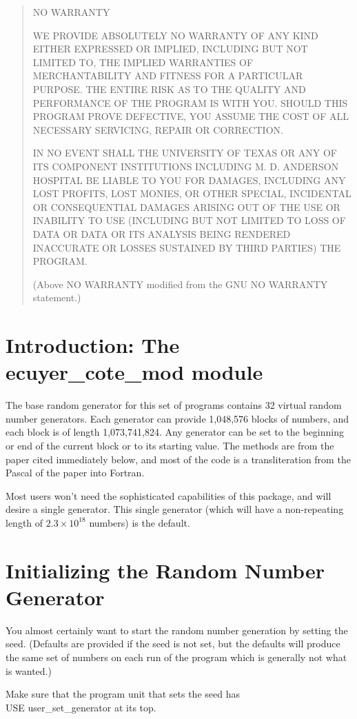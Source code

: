 \documentclass[12pt,dvips]{article}
\newcommand{\mysection}[1]{\color{blue}
            \section{#1} \normalcolor}
\begin{document}
\begin{quote}

{\centering NO WARRANTY\\}

WE PROVIDE ABSOLUTELY  NO WARRANTY  OF ANY  KIND  EITHER  EXPRESSED OR
IMPLIED,  INCLUDING BUT   NOT LIMITED TO,  THE  IMPLIED  WARRANTIES OF
MERCHANTABILITY AND FITNESS FOR A PARTICULAR PURPOSE.  THE ENTIRE RISK
AS TO THE QUALITY AND PERFORMANCE OF THE PROGRAM IS  WITH YOU.  SHOULD
THIS PROGRAM PROVE  DEFECTIVE, YOU ASSUME  THE COST  OF  ALL NECESSARY
SERVICING, REPAIR OR CORRECTION.

IN NO  EVENT  SHALL THE UNIVERSITY  OF TEXAS OR  ANY  OF ITS COMPONENT
INSTITUTIONS INCLUDING M. D.   ANDERSON HOSPITAL BE LIABLE  TO YOU FOR
DAMAGES, INCLUDING ANY  LOST PROFITS, LOST MONIES,   OR OTHER SPECIAL,
INCIDENTAL   OR  CONSEQUENTIAL DAMAGES   ARISING   OUT  OF  THE USE OR
INABILITY TO USE (INCLUDING BUT NOT LIMITED TO LOSS OF DATA OR DATA OR
ITS ANALYSIS BEING  RENDERED INACCURATE OR  LOSSES SUSTAINED  BY THIRD
PARTIES) THE PROGRAM.

(Above NO WARRANTY modified from the GNU NO WARRANTY statement.)
\end{quote}


\pagebreak

\mysection{Introduction: The ecuyer\_cote\_mod module}

The base random generator for this set of programs contains 32 virtual
random number generators.  Each generator can provide 1,048,576 blocks
of numbers, and each block  is of length 1,073,741,824.  Any generator
can be  set to the  beginning or  end of the  current block or  to its
starting  value.  The  methods are  from the  paper  cited immediately
below, and  most of the code  is a transliteration from  the Pascal of
the paper into Fortran.


Most users won't need  the sophisticated capabilities of this package,
and will desire a single generator.  This single generator (which will
have  a non-repeating  length of  $2.3 \times  10^18$ numbers)  is the
default.

\mysection{Initializing the Random Number Generator}

You almost  certainly want  to start the  random number  generation by
setting the seed.  (Defaults are provided  if the seed is not set, but
the defaults will  produce the same set of numbers on  each run of the
program which is generally not what is wanted.)

Make   sure  that  the  program unit  that   sets  the seed has\\  
USE user\_set\_generator at its top.
\end{document}
